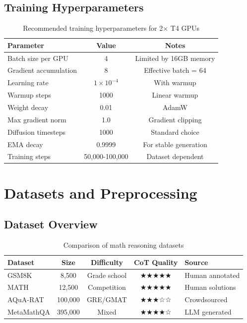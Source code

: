 \documentclass[11pt,a4paper]{article}
\begin{document}
\subsection{Training Hyperparameters}

\begin{table}[H]
\centering
\caption{Recommended training hyperparameters for 2× T4 GPUs}
\begin{tabular}{lcc}
\toprule
\textbf{Parameter} & \textbf{Value} & \textbf{Notes} \\
\midrule
Batch size per GPU & 4 & Limited by 16GB memory \\
Gradient accumulation & 8 & Effective batch = 64 \\
Learning rate & $1 \times 10^{-4}$ & With warmup \\
Warmup steps & 1000 & Linear warmup \\
Weight decay & 0.01 & AdamW \\
Max gradient norm & 1.0 & Gradient clipping \\
Diffusion timesteps & 1000 & Standard choice \\
EMA decay & 0.9999 & For stable generation \\
Training steps & 50,000-100,000 & Dataset dependent \\
\bottomrule
\end{tabular}
\label{tab:hyperparams}
\end{table}

\section{Datasets and Preprocessing}

\subsection{Dataset Overview}

\begin{table}[H]
\centering
\caption{Comparison of math reasoning datasets}
\begin{tabular}{lcccl}
\toprule
\textbf{Dataset} & \textbf{Size} & \textbf{Difficulty} & \textbf{CoT Quality} & \textbf{Source} \\
\midrule
GSM8K & 8,500 & Grade school & ★★★★★ & Human annotated \\
MATH & 12,500 & Competition & ★★★★★ & Human solutions \\
AQuA-RAT & 100,000 & GRE/GMAT & ★★★☆☆ & Crowdsourced \\
MetaMathQA & 395,000 & Mixed & ★★★★☆ & LLM generated \\
\bottomrule
\end{tabular}
\label{tab:datasets}
\end{table}
\end{document}
